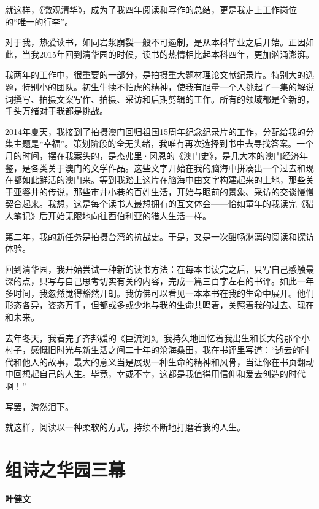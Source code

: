 \documentclass[openany,scheme = chinese, linespread = 1.5]{ctexbook}
\newcommand \name[1]{\begin{center} \kaishu \Large \bfseries #1 \end{center}}
\begin{document}
就这样，《微观清华》，成为了我四年阅读和写作的总结，更是我走上工作岗位的“唯一的行李”。

对于我，热爱读书，如同岩浆崩裂一般不可遏制，是从本科毕业之后开始。正因如此，当我2015年回到清华园的时候，读书的热情相比起本科四年，更加汹涌澎湃。

我两年的工作中，很重要的一部分，是拍摄重大题材理论文献纪录片。特别大的选题，特别小的团队。初生牛犊不怕虎的精神，使我有胆量一个人挑起了一集的解说词撰写、拍摄文案写作、拍摄、采访和后期剪辑的工作。所有的领域都是全新的，千头万绪对于我都是挑战。

2014年夏天，我接到了拍摄澳门回归祖国15周年纪念纪录片的工作，分配给我的分集主题是“幸福”。策划阶段的全无头绪，我唯有再次选择到书中去寻找答案。一个月的时间，摆在我案头的，是杰弗里·冈恩的《澳门史》，是几大本的澳门经济年鉴，是各类关于澳门的文学作品。这些文字开始在我的脑海中拼凑出一个过去和现在都如此鲜活的澳门来。等到我踏上这片在脑海中由文字构建起来的土地，那些关于亚婆井的传说，那些市井小巷的百姓生活，开始与眼前的景象、采访的交谈慢慢契合起来。我想，这是每个读书人最想拥有的互文体会——恰如童年的我读完《猎人笔记》后开始无限地向往西伯利亚的猎人生活一样。

第二年，我的新任务是拍摄台湾的抗战史。于是，又是一次酣畅淋漓的阅读和探访体验。

回到清华园，我开始尝试一种新的读书方法：在每本书读完之后，只写自己感触最深的点，只写与自己思考切实有关的内容，完成一篇三百字左右的书评。如此一年多时间，我忽然觉得豁然开朗。我仿佛可以看见一本本书在我的生命中展开。他们形态各异，姿态万千，但都或多或少地与我的生命共鸣着，关照着我的过去、现在和未来。

去年冬天，我看完了齐邦媛的《巨流河》。我持久地回忆着我出生和长大的那个小村子，感慨旧时光与新生活之间二十年的沧海桑田，我在书评里写道：“逝去的时代和他人的故事，最大的意义当是展现一种生命的精神和风骨，当让你在书页翻动中回想起自己的人生。毕竟，幸或不幸，这都是我值得用信仰和爱去创造的时代啊！”

写罢，潸然泪下。

就这样，阅读以一种柔软的方式，持续不断地打磨着我的人生。

\newpage
\section{组诗之华园三幕}
\name{叶健文}
\end{document}
